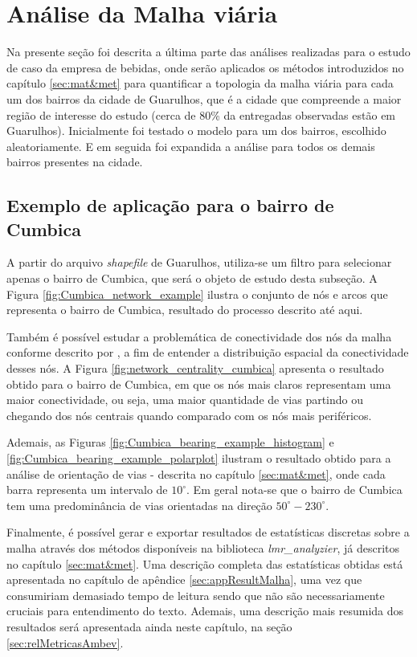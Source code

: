 \section{Análise da Malha viária} \label{sec:AMBEV_MalhaViaria}

Na presente seção foi descrita a última parte das análises realizadas para o estudo de caso da empresa de bebidas, onde serão aplicados os métodos introduzidos no capítulo \ref{sec:mat&met} para quantificar a topologia da malha viária para cada um dos bairros da cidade de Guarulhos, que é a cidade que compreende a maior região de interesse do estudo (cerca de 80\% da entregadas observadas estão em Guarulhos).
Inicialmente foi testado o modelo para um dos bairros, escolhido aleatoriamente. 
E em seguida foi expandida a análise para todos os demais bairros presentes na cidade.

\subsection{Exemplo de aplicação para o bairro de Cumbica}

A partir do arquivo \textit{shapefile} de Guarulhos, utiliza-se um filtro para selecionar apenas o bairro de Cumbica, que será o objeto de estudo desta subseção. 
%
A Figura \ref{fig:Cumbica_network_example} ilustra o conjunto de nós e arcos que representa o bairro de Cumbica, resultado do processo descrito até aqui.
%

Também é possível estudar a problemática de conectividade dos nós da malha conforme descrito por , a fim de entender a distribuição espacial da conectividade desses nós.
%
A Figura \ref{fig:network_centrality_cumbica} apresenta o resultado obtido para o bairro de Cumbica, em que os nós mais claros representam uma maior conectividade, ou seja, uma maior quantidade de vias partindo ou chegando dos nós centrais quando comparado com os nós mais periféricos. 

Ademais, as Figuras \ref{fig:Cumbica_bearing_example_histogram} e \ref{fig:Cumbica_bearing_example_polarplot} ilustram o resultado obtido para a análise de orientação de vias - descrita no capítulo \ref{sec:mat&met}, onde cada barra representa um intervalo de $10^{\circ}$.
Em geral nota-se que o bairro de Cumbica tem uma predominância de vias orientadas na direção $50^{\circ}-230^{\circ}$.

Finalmente, é possível gerar e exportar resultados de estatísticas discretas sobre a malha através dos métodos disponíveis na biblioteca \textit{lmr\_analyzier}, já descritos no capítulo \ref{sec:mat&met}.
%
Uma descrição completa das estatísticas obtidas está apresentada no capítulo de apêndice \ref{sec:appResultMalha}, uma vez que consumiriam demasiado tempo de leitura sendo que não são necessariamente cruciais para entendimento do texto. 
Ademais, uma descrição mais resumida dos resultados será apresentada ainda neste capítulo, na seção \ref{sec:relMetricasAmbev}.

